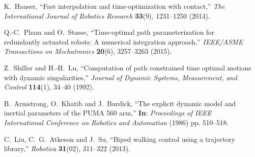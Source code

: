 \documentclass{rob}%
\begin{document}
\begin{thebibliography}{30}
K.~Hauser, ``{Fast interpolation and time-optimization with contact},''
\emph{The International Journal of Robotics Research} \textbf{33}(9), 1231--1250 (2014).

Q.-C.~Pham and O.~Stasse, ``{Time-optimal path parameterization for redundantly
	actuated robots: A numerical integration approach},'' \emph{IEEE/ASME
	Transactions on Mechatronics} \textbf{20}(6), 3257--3263 (2015).

Z.~Shiller and H.-H.~Lu, ``{Computation of path constrained time optimal
	motions with dynamic singularities},'' \emph{Journal of Dynamic Systems,
	Measurement, and Control} \textbf{114}(1), 34--40 (1992).

B.~Armstrong, O.~Khatib and J.~Burdick, ``{The explicit dynamic model and
	inertial parameters of the PUMA 560 arm},'' \textbf{In}: \emph{Proceedings of IEEE
	International Conference on Robotics and Automation} (1986) pp. 510--518.

C.~Liu, C.~G.~Atkeson and J.~Su, ``{Biped walking control using a trajectory library},'' \emph{Robotica} \textbf{31}(02), 311--322 (2013).

\end{thebibliography}

%
\end{document}

